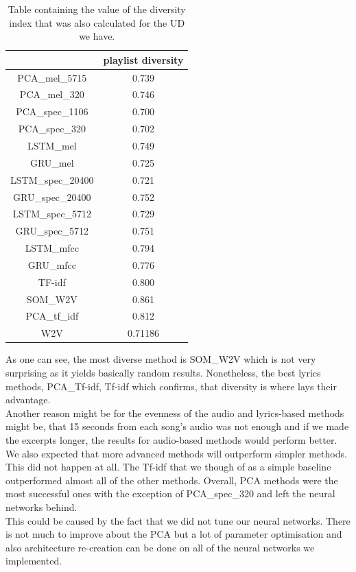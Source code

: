 \begin{table}[h]
\centering

\begin{tabu} to 1.7\textwidth {| c | c |}
\hline
{} & \textbf{playlist diversity} \\
\hline
PCA\_mel\_5715 & 0.739 \\
\hline
PCA\_mel\_320 & 0.746 \\
\hline
PCA\_spec\_1106 & 0.700 \\
\hline
PCA\_spec\_320 & 0.702 \\
\hline
LSTM\_mel & 0.749 \\
\hline
GRU\_mel & 0.725 \\
\hline
LSTM\_spec\_20400 & 0.721 \\
\hline
GRU\_spec\_20400 &  0.752\\
\hline
LSTM\_spec\_5712 & 0.729 \\
\hline
GRU\_spec\_5712 &  0.751 \\
\hline
LSTM\_mfcc & 0.794 \\
\hline
GRU\_mfcc & 0.776 \\
\hline
TF-idf & 0.800 \\
\hline
SOM\_W2V & 0.861 \\
\hline
PCA\_tf\_idf & 0.812 \\
\hline
W2V & 0.71186 \\
\hline
\end{tabu} 
\caption{Table containing the value of the diversity index that was also calculated for the UD we have.}
\label{table:diversity_table}
\end{table}
As one can see, the most diverse method is SOM\_W2V which is not very surprising as it yields basically random results. Nonetheless, the best lyrics methods, PCA\_Tf-idf, Tf-idf which confirms, that diversity is where lays their advantage.\\
Another reason might be for the evenness of the audio and lyrics-based methods might be, that 15 seconds from each song's audio was not enough and if we made the excerpts longer, the results for audio-based methods would perform better. \\ 

We also expected that more advanced methods will outperform simpler methods. This did not happen at all. The Tf-idf that we though of as a simple baseline outperformed almost all of the other methods. Overall, PCA methods were the most successful ones with the exception of PCA\_spec\_320 and left the neural networks behind. \\
This could be caused by the fact that we did not tune our neural networks. There is not much to improve about the PCA but a lot of parameter optimisation and also architecture re-creation can be done on all of the neural networks we implemented. \\


